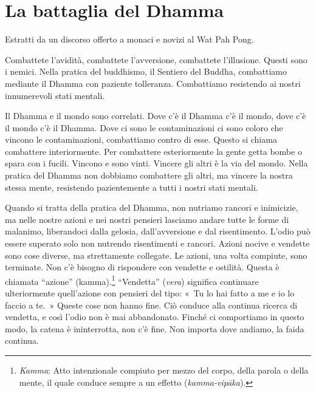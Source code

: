 \chapter{La battaglia del Dhamma}

\begin{openingQuote}
  \centering

  Estratti da un discorso offerto a monaci e novizi al Wat Pah Pong.
\end{openingQuote}

Combattete l'avidità, combattete l'avversione, combattete l'illusione.
Questi sono i nemici. Nella pratica del buddhismo, il Sentiero del
Buddha, combattiamo mediante il Dhamma con paziente tolleranza.
Combattiamo resistendo ai nostri innumerevoli stati mentali.

Il Dhamma e il mondo sono correlati. Dove c'è il Dhamma c'è il mondo,
dove c'è il mondo c'è il Dhamma. Dove ci sono le contaminazioni ci sono
coloro che vincono le contaminazioni, combattiamo contro di esse. Questo
si chiama combattere interiormente. Per combattere esteriormente la
gente getta bombe o spara con i fucili. Vincono e sono vinti. Vincere
gli altri è la via del mondo. Nella pratica del Dhamma non dobbiamo
combattere gli altri, ma vincere la nostra stessa mente, resistendo
pazientemente a tutti i nostri stati mentali.

Quando si tratta della pratica del Dhamma, non nutriamo rancori e
inimicizie, ma nelle nostre azioni e nei nostri pensieri lasciamo andare
tutte le forme di malanimo, liberandoci dalla gelosia, dall'avversione
e dal risentimento. L'odio può essere superato solo non nutrendo
risentimenti e rancori. Azioni nocive e vendette sono cose diverse, ma
strettamente collegate. Le azioni, una volta compiute, sono terminate.
Non c'è bisogno di rispondere con vendette e ostilità. Questa è chiamata
``azione'' (kamma).\footnote{\emph{Kamma}: Atto intenzionale
  compiuto per mezzo del corpo, della parola o della mente, il quale
  conduce sempre a un effetto (\emph{kamma-vipāka}).} ``Vendetta''
(\emph{vera}) significa continuare ulteriormente quell'azione con
pensieri del tipo: «~Tu lo hai fatto a me e io lo faccio a te.~» Queste
cose non hanno fine. Ciò conduce alla continua ricerca di vendetta, e
così l'odio non è mai abbandonato. Finché ci comportiamo in questo modo,
la catena è ininterrotta, non c'è fine. Non importa dove andiamo, la
faida continua.

